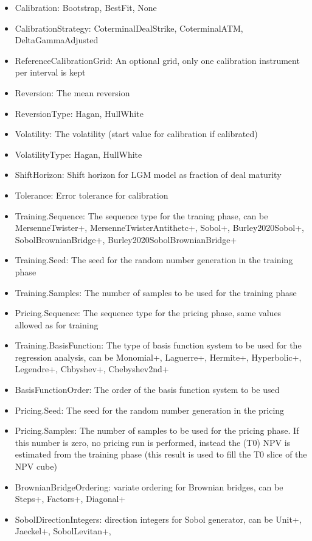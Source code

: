\begin{itemize}
\item Calibration: Bootstrap, BestFit, None
\item CalibrationStrategy: CoterminalDealStrike, CoterminalATM, DeltaGammaAdjusted
\item ReferenceCalibrationGrid: An optional grid, only one calibration instrument per interval is kept
\item Reversion: The mean reversion
\item ReversionType: Hagan, HullWhite
\item Volatility: The volatility (start value for calibration if calibrated)
\item VolatilityType: Hagan, HullWhite
\item ShiftHorizon: Shift horizon for LGM model as fraction of deal maturity
\item Tolerance: Error tolerance for calibration
\item Training.Sequence: The sequence type for the traning phase, can be MersenneTwister+, MersenneTwisterAntithetc+,
  Sobol+, Burley2020Sobol+, SobolBrownianBridge+, Burley2020SobolBrownianBridge+
\item Training.Seed: The seed for the random number generation in the training phase
\item Training.Samples: The number of samples to be used for the training phase
\item Pricing.Sequence: The sequence type for the pricing phase, same values allowed as for training
\item Training.BasisFunction: The type of basis function system to be used for the regression analysis, can be
  Monomial+, Laguerre+, Hermite+, Hyperbolic+, Legendre+, Chbyshev+, Chebyshev2nd+
\item BasisFunctionOrder: The order of the basis function system to be used
\item Pricing.Seed: The seed for the random number generation in the pricing
\item Pricing.Samples: The number of samples to be used for the pricing phase. If this number is zero, no pricing run is
  performed, instead the (T0) NPV is estimated from the training phase (this result is used to fill the T0 slice of the
  NPV cube)
\item BrownianBridgeOrdering: variate ordering for Brownian bridges, can be Steps+, Factors+, Diagonal+
\item SobolDirectionIntegers: direction integers for Sobol generator, can be Unit+, Jaeckel+, SobolLevitan+,

\end{itemize}
